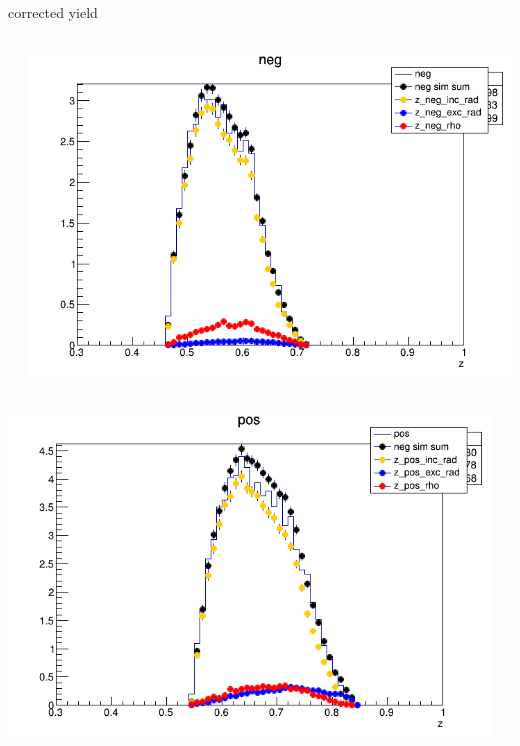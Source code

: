 \begin{frame}{corrected yield}
\begin{columns}
\begin{column}[T]{0.25\textwidth}
\end{column}
\begin{column}[T]{0.25\textwidth}
\includegraphics[width = \textwidth]{results/yield/statistics_corr/yield_x_Q2_z_0.55_5.500_0.55_neg.png}
\end{column}
\end{columns}
\begin{columns}
\begin{column}[T]{0.25\textwidth}
\includegraphics[width = \textwidth]{results/yield/statistics_corr/yield_x_Q2_z_0.55_5.500_0.65_pos.png}
\end{column}
\begin{column}[T]{0.25\textwidth}

\end{column}
\end{columns}
\end{frame}
